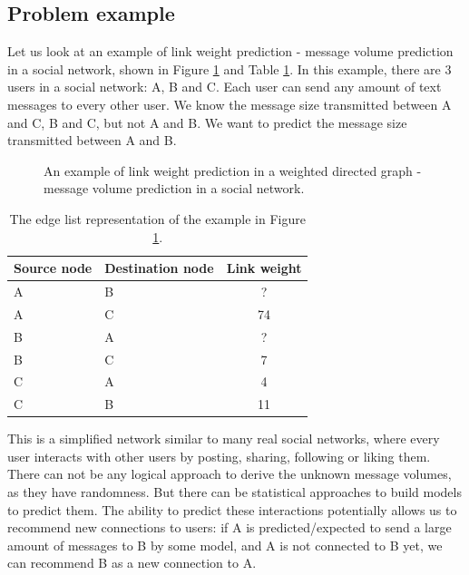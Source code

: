 \documentclass[conference]{IEEEtran}
\begin{document}
\subsection{Problem example}
Let us look at an example of link weight prediction - message volume prediction in a social network, shown in Figure \ref{fig:example} and Table \ref{tab:example}.
In this example, there are 3 users in a social network: A, B and C.
Each user can send any amount of text messages to every other user.
We know the message size transmitted between A and C, B and C, but not A and B.
We want to predict the message size transmitted between A and B.
\begin{figure}[!htb]\centering
	\caption{
		An example of link weight prediction in a weighted directed graph -
		message volume prediction in a social network.
		}
	\label{fig:example}
\end{figure}
\begin{table}[!htb]\centering
	\caption{
		The edge list representation of the example in Figure \ref{fig:example}.
	}
	\begin{tabularx}{0.45\textwidth}{|X|X|c|}  \hline \rowcolor{blue!40}
		Source node & Destination node & Link weight \\ \hline
		A & B & ? \\ \hline
		A & C & 74 \\ \hline
		B & A & ? \\ \hline
		B & C & 7 \\ \hline
		C & A & 4 \\ \hline
		C & B & 11 \\ \hline
	\end{tabularx}
	\label{tab:example}
\end{table}
This is a simplified network similar to many real social networks, where every user interacts with other users by posting, sharing, following or liking them.
There can not be any logical approach to derive the unknown message volumes,
as they have randomness.
But there can be statistical approaches to build models to predict them.
The ability to predict these interactions potentially allows us to recommend new connections to users:
if A is predicted/expected to send a large amount of messages to B by some model,
and A is not connected to B yet,
we can recommend B as a new connection to A.
\end{document}
